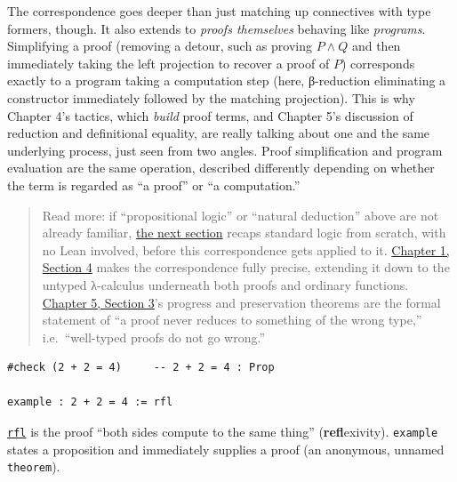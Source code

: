 The correspondence goes deeper than just matching up connectives with type formers, though. It also extends to \emph{proofs themselves} behaving like \emph{programs}. Simplifying a proof (removing a detour, such as proving \(P \wedge Q\) and then immediately taking the left projection to recover a proof of \(P\)) corresponds exactly to a program taking a computation step (here, β-reduction eliminating a constructor immediately followed by the matching projection). This is why Chapter 4's tactics, which \emph{build} proof terms, and Chapter 5's discussion of reduction and definitional equality, are really talking about one and the same underlying process, just seen from two angles. Proof simplification and program evaluation are the same operation, described differently depending on whether the term is regarded as ``a proof'' or ``a computation.''

\begin{quote}
Read more: if ``propositional logic'' or ``natural deduction'' above are not already familiar, \hyperref[sec:03-propositions-and-proofs:02-logic-recap:1]{the next section} recaps standard logic from scratch, with no Lean involved, before this correspondence gets applied to it. \hyperref[sec:01-basics:05-pi-sigma-and-coc:1]{Chapter 1, Section 4} makes the correspondence fully precise, extending it down to the untyped λ-calculus underneath both proofs and ordinary functions. \hyperref[sec:05-rigor-check:03-typing-rules-and-safety:1]{Chapter 5, Section 3}'s progress and preservation theorems are the formal statement of ``a proof never reduces to something of the wrong type,'' i.e.~``well-typed proofs do not go wrong.''
\end{quote}

\begin{lstlisting}
#check (2 + 2 = 4)     -- 2 + 2 = 4 : Prop

example : 2 + 2 = 4 := rfl
\end{lstlisting}

\href{https://lean-lang.org/doc/reference/latest/Tactic-Proofs/Tactic-Reference/}{\texttt{rfl}} is the proof ``both sides compute to the same thing'' (\textbf{refl}exivity). \texttt{example} states a proposition and immediately supplies a proof (an anonymous, unnamed \texttt{theorem}).

